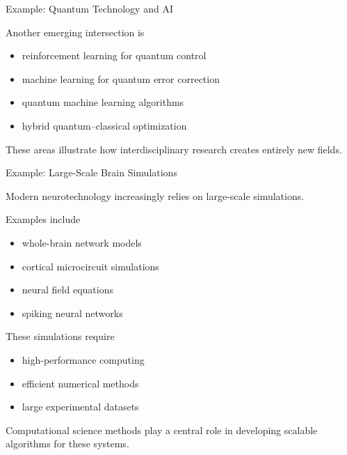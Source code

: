 \documentclass{beamer}
\begin{document}
\begin{frame}{Example: Quantum Technology and AI}

Another emerging intersection is

\begin{itemize}
\item reinforcement learning for quantum control
\item machine learning for quantum error correction
\item quantum machine learning algorithms
\item hybrid quantum–classical optimization
\end{itemize}

These areas illustrate how interdisciplinary research
creates entirely new fields.

\end{frame}

\begin{frame}{Example: Large-Scale Brain Simulations}

Modern neurotechnology increasingly relies on large-scale simulations.

Examples include

\begin{itemize}
\item whole-brain network models
\item cortical microcircuit simulations
\item neural field equations
\item spiking neural networks
\end{itemize}

These simulations require

\begin{itemize}
\item high-performance computing
\item efficient numerical methods
\item large experimental datasets
\end{itemize}

Computational science methods play a central role in
developing scalable algorithms for these systems.

\end{frame}
\end{document}
